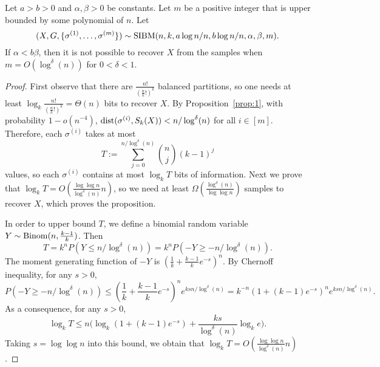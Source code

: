 \documentclass{article}
\begin{document}
\begin{proposition}  \label{prop:ab}
Let $a>b>0$ and $\alpha,\beta>0$ be constants. Let $m$ be a positive integer that is upper bounded by some polynomial of $n$.
Let 
$$
(X,G,\{\sigma^{(1)},\dots,\sigma^{(m)}\})\sim \operatorname{SIBM}(n,k, a\log n/n, b\log n/n,\alpha,\beta, m) .
$$
If $\alpha<b\beta$, then it is not possible to recover $X$ from the samples when $m=O(\log^{\delta}(n))$ for $0 < \delta < 1$.
\end{proposition}

\begin{proof}
First observe that there are $\frac{n!}{(\frac{n}{k}!)^k}$ balanced partitions, so one needs at least $\log_k \frac{n!}{(\frac{n}{k}!)^k}=\Theta(n)$ bits to recover $X$.
By Proposition~\ref{prop:1}, with probability $1-o(n^{-4})$, $\operatorname{dist}(\sigma^{(i)}, S_k(X))< n/\log^{\delta}(n)$
for all $i\in[m]$. Therefore, each $\sigma^{(i)}$ takes at most
$$
T:=\sum_{j=0}^{n/\log^{\delta}(n)} \binom{n}{j}(k-1)^j
$$
values, so each $\sigma^{(i)}$ contains at most $\log_k T$ bits of information. Next we prove that $\log_k T=O(\frac{\log\log n}{\log^{\delta}(n)} n)$, so we need at least $\Omega(\frac{\log^{\delta}(n)}{\log\log n})$ samples to recover $X$, which proves the proposition.

In order to upper bound $T$, we define a binomial random variable $Y\sim\operatorname{Binom}(n,\frac{k-1}{k})$. Then
$$
T=k^n P(Y\le n/\log^{\delta}(n))
= k^n P(-Y\ge -n/\log^{\delta}(n)).
$$
The moment generating function of $-Y$ is $(\frac{1}{k}+\frac{k-1}{k}e^{-s})^n$. By Chernoff inequality, for any $s>0$,
$$
P(-Y\ge - n/\log^{\delta}(n)) \le
(\frac{1}{k}+\frac{k-1}{k}e^{-s})^n
e^{ksn/\log^{\delta}(n)}
= k^{-n} (1+(k-1)e^{-s})^n e^{ksn/\log^{\delta}(n)} .
$$
As a consequence, for any $s>0$,
$$
\log_k T\le n\Big(\log_k(1+(k-1)e^{-s})
+\frac{ks}{\log^{\delta}(n)}\log_k e \Big) .
$$
Taking $s=\log\log n$ into this bound, we obtain that $\log_k T=O(\frac{\log\log n}{\log^{\delta}(n)} n)$.
\end{proof}
\end{document}
